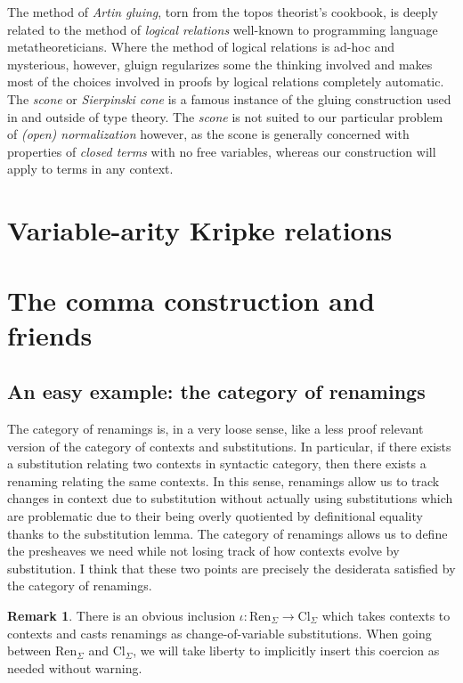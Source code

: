 \documentclass[12pt,twoside]{reedthesis}
\theoremstyle{definition}
\newtheorem{remark}{Remark}
\theoremstyle{remark}
\theoremstyle{plain}
\newcommand{\cl}{\text{Cl}_\Sigma}
\newcommand{\ren}{\text{Ren}_\Sigma}
\begin{document}
The method of \emph{Artin gluing}, torn from the topos theorist's cookbook, is
deeply related to the method of \emph{logical relations} well-known to
programming language metatheoreticians. Where the method of logical relations is
ad-hoc and mysterious, however, gluign regularizes some the thinking involved
and makes most of the choices involved in proofs by logical relations completely
automatic. The \emph{scone} or \emph{Sierpinski cone} is a famous instance of
the gluing construction used in and outside of type theory. The \emph{scone} is
not suited to our particular problem of \emph{(open) normalization} however, as
the scone is generally concerned with properties of \emph{closed terms} with no
free variables, whereas our construction will apply to terms in any context.

\section{Variable-arity Kripke relations}

\section{The comma construction and friends}

\subsection{An easy example: the category of renamings}
The category of renamings is, in a very loose sense, like a less proof relevant
version of the category of contexts and substitutions. In particular, if there
exists a substitution relating two contexts in syntactic category, then there
exists a renaming relating the same contexts. In this sense, renamings allow us
to track changes in context due to substitution without actually using
substitutions which are problematic due to their being overly quotiented by
definitional equality thanks to the substitution lemma. The category of
renamings allows us to define the presheaves we need while not losing track of
how contexts evolve by substitution. I think that these two points are precisely
the desiderata satisfied by the category of renamings.

\begin{remark}
  There is an obvious inclusion \( \iota : \ren \rightarrow \cl \) which takes contexts to
  contexts and casts renamings as change-of-variable substitutions. When going
  between \( \ren \) and \( \cl \), we will take liberty to implicitly insert
  this coercion as needed without warning.
\end{remark}
\end{document}
